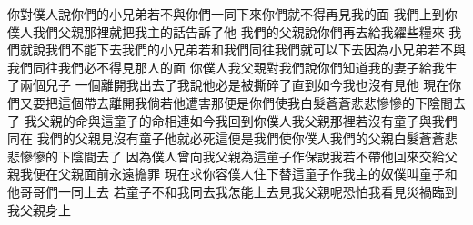 你對僕人說\chientien 你們的小兄弟若不與你們一同下來\chientien 你們就不得再見我的面\chuan 
{}我們上到你僕人我們父親那裡\chientien 就把我主的話告訴了他\chuan 
{}我們的父親說\chientien 你們再去給我糴些糧來\chuan 
{}我們就說\chientien 我們不能下去\chientien 我們的小兄弟若和我們同往\chientien 我們就可以下去\chientien 因為小兄弟若不與我們同往\chientien 我們必不得見那人的面\chuan 
{}你僕人我父親對我們說\chientien 你們知道我的妻子給我生了兩個兒子\chuan 
{}一個離開我出去了\chientien 我說\chientien 他必是被撕碎了\chientien 直到如今我也沒有見他\yuentien 
{}現在你們又要把這個帶去離開我\chientien 倘若他遭害\chientien 那便是你們使我白髮蒼蒼\chientien 悲悲慘慘的下陰間去了\chuan
{}我父親的命與這童子的命相連\chientien 如今我回到你僕人我父親那裡\chientien 若沒有童子與我們同在\chientien 
{}我們的父親見沒有童子\chientien 他就必死\yuentien 這便是我們使你僕人我們的父親白髮蒼蒼\chientien 悲悲慘慘的下陰間去了\chuan 
{}因為僕人曾向我父親為這童子作保\chientien 說\chientien 我若不帶他回來交給父親\chientien 我便在父親面前永遠擔罪\chuan 
{}現在求你容僕人住下\chientien 替這童子作我主的奴僕\chientien 叫童子和他哥哥們一同上去\chuan 
{}若童子不和我同去\chientien 我怎能上去見我父親呢\chientien 恐怕我看見災禍臨到我父親身上\chuan 
